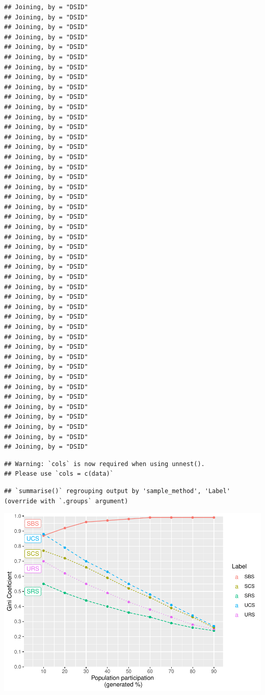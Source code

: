 \documentclass[
  english,
  man,floatsintext]{apa6}
\begin{document}
\begin{verbatim}
## Joining, by = "DSID"
## Joining, by = "DSID"
## Joining, by = "DSID"
## Joining, by = "DSID"
## Joining, by = "DSID"
## Joining, by = "DSID"
## Joining, by = "DSID"
## Joining, by = "DSID"
## Joining, by = "DSID"
## Joining, by = "DSID"
## Joining, by = "DSID"
## Joining, by = "DSID"
## Joining, by = "DSID"
## Joining, by = "DSID"
## Joining, by = "DSID"
## Joining, by = "DSID"
## Joining, by = "DSID"
## Joining, by = "DSID"
## Joining, by = "DSID"
## Joining, by = "DSID"
## Joining, by = "DSID"
## Joining, by = "DSID"
## Joining, by = "DSID"
## Joining, by = "DSID"
## Joining, by = "DSID"
## Joining, by = "DSID"
## Joining, by = "DSID"
## Joining, by = "DSID"
## Joining, by = "DSID"
## Joining, by = "DSID"
## Joining, by = "DSID"
## Joining, by = "DSID"
## Joining, by = "DSID"
## Joining, by = "DSID"
## Joining, by = "DSID"
## Joining, by = "DSID"
## Joining, by = "DSID"
## Joining, by = "DSID"
## Joining, by = "DSID"
## Joining, by = "DSID"
## Joining, by = "DSID"
## Joining, by = "DSID"
## Joining, by = "DSID"
## Joining, by = "DSID"
## Joining, by = "DSID"
\end{verbatim}

\begin{verbatim}
## Warning: `cols` is now required when using unnest().
## Please use `cols = c(data)`
\end{verbatim}

\begin{verbatim}
## `summarise()` regrouping output by 'sample_method', 'Label' (override with `.groups` argument)
\end{verbatim}

\includegraphics{5---Analysis_files/figure-latex/unnamed-chunk-37-1.pdf}
\end{document}
